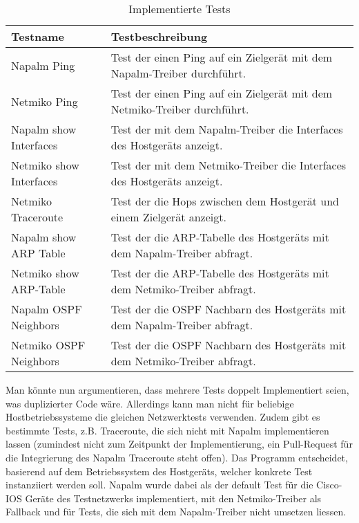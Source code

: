 \documentclass[]{subfiles}
\begin{document}
\begin{table}[h!]
    \begin{tabularx}{\textwidth}{lX}
        \toprule
        Testname & Testbeschreibung \\
        \midrule
        Napalm Ping & Test der einen Ping auf ein Zielgerät mit dem Napalm-Treiber durchführt.\\
        Netmiko Ping & Test der einen Ping auf ein Zielgerät mit dem Netmiko-Treiber durchführt. \\
        Napalm show Interfaces & Test der mit dem Napalm-Treiber die Interfaces des Hostgeräts anzeigt.\\
        Netmiko show Interfaces & Test der mit dem Netmiko-Treiber die Interfaces des Hostgeräts anzeigt.\\
        Netmiko Traceroute & Test der die Hops zwischen dem Hostgerät und einem Zielgerät anzeigt.\\
        Napalm show ARP Table & Test der die ARP-Tabelle des Hostgeräts mit dem Napalm-Treiber abfragt. \\
        Netmiko show ARP-Table & Test der die ARP-Tabelle des Hostgeräts mit dem Netmiko-Treiber abfragt. \\
        Napalm OSPF Neighbors & Test der die OSPF Nachbarn des Hostgeräts mit dem Napalm-Treiber abfragt. \\
        Netmiko OSPF Neighbors & Test der die OSPF Nachbarn des Hostgeräts mit dem Netmiko-Treiber abfragt. \\
        \bottomrule
    \end{tabularx}
    \caption{Implementierte Tests}
\end{table}


Man könnte nun argumentieren, dass mehrere Tests doppelt Implementiert seien, was duplizierter Code wäre.
Allerdings kann man nicht für beliebige Hostbetriebssysteme die gleichen Netzwerktests verwenden.
Zudem gibt es bestimmte Tests, z.B. Traceroute, die sich nicht mit Napalm implementieren lassen
(zumindest nicht zum Zeitpunkt der Implementierung, ein Pull-Request für die Integrierung des 
Napalm Traceroute steht offen).
Das Programm entscheidet, basierend auf dem Betriebssystem des Hostgeräts, welcher 
konkrete Test instanziiert werden soll. 
Napalm wurde dabei als der default Test für die Cisco-IOS Geräte des Testnetzwerks implementiert,
mit den Netmiko-Treiber als Fallback und für Tests, die sich mit dem Napalm-Treiber nicht umsetzen liessen.
\end{document}
